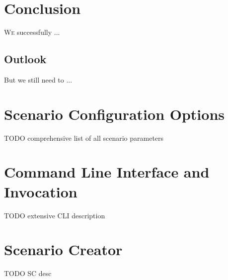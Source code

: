 \documentclass[%
    ]{\PathToTumTemplate/thesis/tum_thesis}
\begin{document}
\chapter{Conclusion} \label{chap:conclusion}
 
\lettrine{W}{e} successfully ...




\section{Outlook}\label{sec:outlook}

But we still need to ...






\begin{appendix}
\chapter{Scenario Configuration Options}\label{appendix:scenarios}
TODO comprehensive list of all scenario parameters

\chapter{Command Line Interface and Invocation}\label{appendix:cli_invocation}
TODO extensive CLI description

\chapter{Scenario Creator}\label{appendix:sc}
TODO SC desc

\end{appendix}



\printglossary[type=acronym]       %

\printglossary





\ifoptionbiblatex
    \printbibliography[heading=bibintoc]              %
\else
\fi
\end{document}
